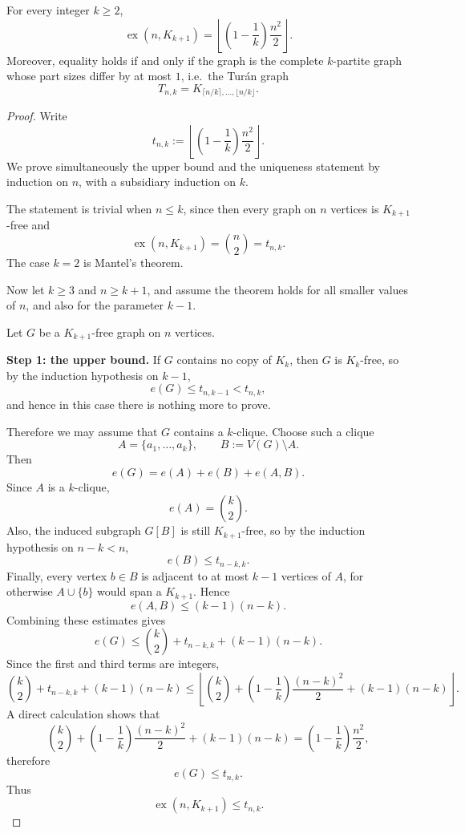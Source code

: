 \documentclass[11pt, a4paper]{ctexrep}
\begin{document}
\begin{theorem}[Tur\'an, 1941]
    For every integer $k \ge 2$,
    \[
        \operatorname{ex}(n,K_{k+1})
        =
        \left\lfloor \left(1-\frac1k\right)\frac{n^2}{2}\right\rfloor .
    \]
    Moreover, equality holds if and only if the graph is the complete $k$-partite graph
    whose part sizes differ by at most $1$, i.e.\ the Tur\'an graph
    \[
        T_{n,k}=K_{\lceil n/k\rceil,\ldots,\lfloor n/k\rfloor}.
    \]
\end{theorem}

\begin{proof}
    Write
    \[
        t_{n,k}:=\left\lfloor \left(1-\frac1k\right)\frac{n^2}{2}\right\rfloor .
    \]
    We prove simultaneously the upper bound and the uniqueness statement by induction on $n$,
    with a subsidiary induction on $k$.

    The statement is trivial when $n\le k$, since then every graph on $n$ vertices is
    $K_{k+1}$-free and
    \[
        \operatorname{ex}(n,K_{k+1})=\binom{n}{2}=t_{n,k}.
    \]
    The case $k=2$ is Mantel's theorem.

    Now let $k\ge 3$ and $n\ge k+1$, and assume the theorem holds for all smaller values of
    $n$, and also for the parameter $k-1$.

    Let $G$ be a $K_{k+1}$-free graph on $n$ vertices.

    \medskip
    \noindent
    \textbf{Step 1: the upper bound.}
    If $G$ contains no copy of $K_k$, then $G$ is $K_k$-free, so by the induction
    hypothesis on $k-1$,
    \[
        e(G)\le t_{n,k-1}<t_{n,k},
    \]
    and hence in this case there is nothing more to prove.

    Therefore we may assume that $G$ contains a $k$-clique.
    Choose such a clique
    \[
        A=\{a_1,\dots,a_k\},
        \qquad
        B:=V(G)\setminus A.
    \]
    Then
    \[
        e(G)=e(A)+e(B)+e(A,B).
    \]
    Since $A$ is a $k$-clique,
    \[
        e(A)=\binom{k}{2}.
    \]
    Also, the induced subgraph $G[B]$ is still $K_{k+1}$-free, so by the induction
    hypothesis on $n-k<n$,
    \[
        e(B)\le t_{n-k,k}.
    \]
    Finally, every vertex $b\in B$ is adjacent to at most $k-1$ vertices of $A$,
    for otherwise $A\cup\{b\}$ would span a $K_{k+1}$.
    Hence
    \[
        e(A,B)\le (k-1)(n-k).
    \]
    Combining these estimates gives
    \[
        e(G)
        \le
        \binom{k}{2}+t_{n-k,k}+(k-1)(n-k).
    \]
    Since the first and third terms are integers,
    \[
        \binom{k}{2}+t_{n-k,k}+(k-1)(n-k)
        \le
        \left\lfloor
        \binom{k}{2}
        +\left(1-\frac1k\right)\frac{(n-k)^2}{2}
        +(k-1)(n-k)
        \right\rfloor.
    \]
    A direct calculation shows that
    \[
        \binom{k}{2}
        +\left(1-\frac1k\right)\frac{(n-k)^2}{2}
        +(k-1)(n-k)
        =
        \left(1-\frac1k\right)\frac{n^2}{2},
    \]
    therefore
    \[
        e(G)\le t_{n,k}.
    \]
    Thus
    \[
        \operatorname{ex}(n,K_{k+1})\le t_{n,k}.
    \]


\end{proof}
\end{document}
